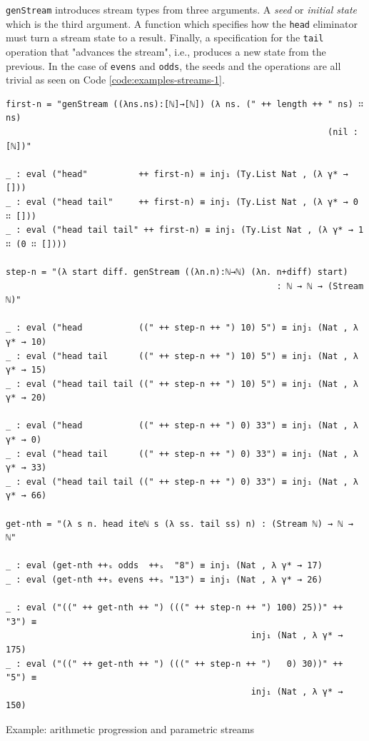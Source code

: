 \verb$genStream$ introduces stream types from three arguments. A \textit{seed} or \textit{initial state} which is the third argument. A function which specifies how the \verb$head$ eliminator must turn a stream state to a result. Finally, a specification for the \verb$tail$ operation that "advances the stream", i.e., produces a new state from the previous. In the case of \verb$evens$ and \verb$odds$, the seeds and the operations are all trivial as seen on Code \ref{code:examples-streams-1}.

\begin{listing}[H]
\begin{verbatim}
first-n = "genStream ((λns.ns):[ℕ]→[ℕ]) (λ ns. (" ++ length ++ " ns) ∷ ns)
                                                               (nil : [ℕ])"

_ : eval ("head"          ++ first-n) ≡ inj₁ (Ty.List Nat , (λ γ* → []))
_ : eval ("head tail"     ++ first-n) ≡ inj₁ (Ty.List Nat , (λ γ* → 0 ∷ []))
_ : eval ("head tail tail" ++ first-n) ≡ inj₁ (Ty.List Nat , (λ γ* → 1 ∷ (0 ∷ [])))

step-n = "(λ start diff. genStream ((λn.n):ℕ→ℕ) (λn. n+diff) start)
                                                     : ℕ → ℕ → (Stream ℕ)"

_ : eval ("head           ((" ++ step-n ++ ") 10) 5") ≡ inj₁ (Nat , λ γ* → 10)
_ : eval ("head tail      ((" ++ step-n ++ ") 10) 5") ≡ inj₁ (Nat , λ γ* → 15)
_ : eval ("head tail tail ((" ++ step-n ++ ") 10) 5") ≡ inj₁ (Nat , λ γ* → 20)

_ : eval ("head           ((" ++ step-n ++ ") 0) 33") ≡ inj₁ (Nat , λ γ* → 0)
_ : eval ("head tail      ((" ++ step-n ++ ") 0) 33") ≡ inj₁ (Nat , λ γ* → 33)
_ : eval ("head tail tail ((" ++ step-n ++ ") 0) 33") ≡ inj₁ (Nat , λ γ* → 66)

get-nth = "(λ s n. head iteℕ s (λ ss. tail ss) n) : (Stream ℕ) → ℕ → ℕ"

_ : eval (get-nth ++ₛ odds  ++ₛ  "8") ≡ inj₁ (Nat , λ γ* → 17)
_ : eval (get-nth ++ₛ evens ++ₛ "13") ≡ inj₁ (Nat , λ γ* → 26)

_ : eval ("((" ++ get-nth ++ ") (((" ++ step-n ++ ") 100) 25))" ++ "3") ≡
                                                inj₁ (Nat , λ γ* → 175)
_ : eval ("((" ++ get-nth ++ ") (((" ++ step-n ++ ")   0) 30))" ++ "5") ≡
                                                inj₁ (Nat , λ γ* → 150)
\end{verbatim}
\caption{Example: arithmetic progression and parametric streams}
\label{code:examples-streams-2}
\end{listing}

